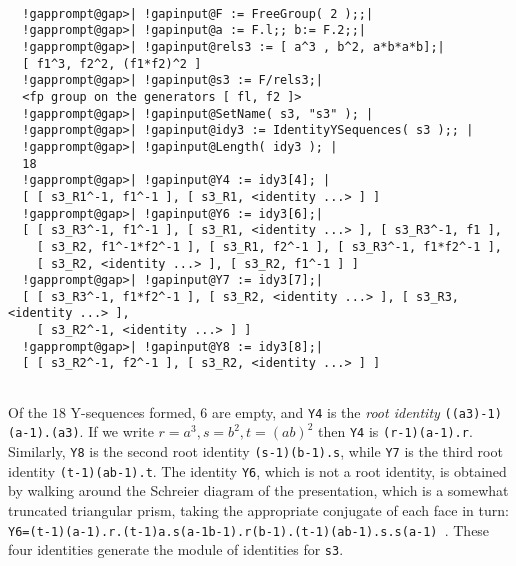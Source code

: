 \documentclass[a4paper,11pt]{report}
\begin{document}
{{ 
\begin{Verbatim}[commandchars=!@|,fontsize=\small,frame=single,label=Example]
  
  !gapprompt@gap>| !gapinput@F := FreeGroup( 2 );;|
  !gapprompt@gap>| !gapinput@a := F.l;; b:= F.2;;|
  !gapprompt@gap>| !gapinput@rels3 := [ a^3 , b^2, a*b*a*b];|
  [ f1^3, f2^2, (f1*f2)^2 ]
  !gapprompt@gap>| !gapinput@s3 := F/rels3;|
  <fp group on the generators [ fl, f2 ]> 
  !gapprompt@gap>| !gapinput@SetName( s3, "s3" ); |
  !gapprompt@gap>| !gapinput@idy3 := IdentityYSequences( s3 );; |
  !gapprompt@gap>| !gapinput@Length( idy3 ); |
  18
  !gapprompt@gap>| !gapinput@Y4 := idy3[4]; |
  [ [ s3_R1^-1, f1^-1 ], [ s3_R1, <identity ...> ] ]
  !gapprompt@gap>| !gapinput@Y6 := idy3[6];|
  [ [ s3_R3^-1, f1^-1 ], [ s3_R1, <identity ...> ], [ s3_R3^-1, f1 ],
    [ s3_R2, f1^-1*f2^-1 ], [ s3_R1, f2^-1 ], [ s3_R3^-1, f1*f2^-1 ],
    [ s3_R2, <identity ...> ], [ s3_R2, f1^-1 ] ]
  !gapprompt@gap>| !gapinput@Y7 := idy3[7];|
  [ [ s3_R3^-1, f1*f2^-1 ], [ s3_R2, <identity ...> ], [ s3_R3, <identity ...> ],
    [ s3_R2^-1, <identity ...> ] ]
  !gapprompt@gap>| !gapinput@Y8 := idy3[8];|
  [ [ s3_R2^-1, f2^-1 ], [ s3_R2, <identity ...> ] ]
  
\end{Verbatim}
 Of the $18$ Y-sequences formed, $6$ are empty, and \texttt{Y4} is the \emph{root identity} \texttt{((a\texttt{}3)\texttt{}-1)\texttt{}(a\texttt{}-1).(a\texttt{}3)}. If we write $r=a^3, s=b^2, t=(ab)^2$ then \texttt{Y4} is \texttt{(r\texttt{}-1)\texttt{}(a\texttt{}-1).r}. Similarly, \texttt{Y8} is the second root identity \texttt{(s\texttt{}-1)\texttt{}(b\texttt{}-1).s}, while \texttt{Y7} is the third root identity \texttt{(t\texttt{}-1)\texttt{}(ab\texttt{}-1).t}. The identity \texttt{Y6}, which is not a root identity, is obtained by walking around the Schreier
diagram of the presentation, which is a somewhat truncated triangular prism,
taking the appropriate conjugate of each face in turn: \texttt{ Y6=(t\texttt{}-1)\texttt{}(a\texttt{}-1).r.(t\texttt{}-1)\texttt{}a.s\texttt{}(a\texttt{}-1b\texttt{}-1).r\texttt{}(b\texttt{}-1).(t\texttt{}-1)\texttt{}(ab\texttt{}-1).s.s\texttt{}(a\texttt{}-1) }. These four identities generate the module of identities for \texttt{s3}. 

}}
\end{document}
